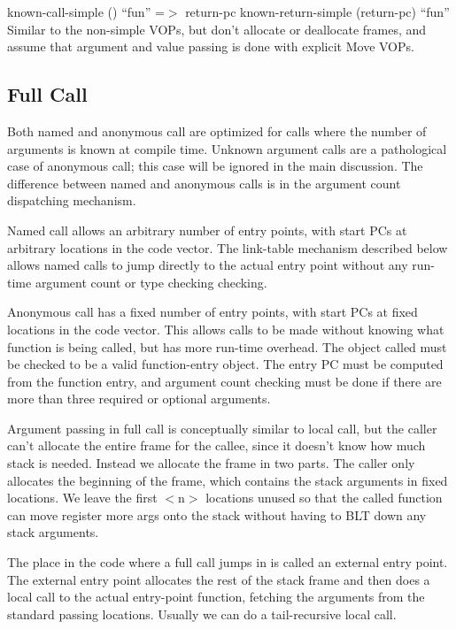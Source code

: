 {\begin{itemize, spread 0, spacing 1}
known-call-simple () ``fun'' =$>$ return-pc
known-return-simple (return-pc) ``fun''
    Similar to the non-simple VOPs, but don't allocate or deallocate frames,
    and assume that argument and value passing is done with explicit Move VOPs.


\subsection{Full Call}

Both named and anonymous call are optimized for calls where the number of
arguments is known at compile time.  Unknown argument calls are a
pathological case of anonymous call; this case will be ignored in the main
discussion.  The difference between named and anonymous calls is in the
argument count dispatching mechanism.

Named call allows an arbitrary number of entry points, with start PCs at
arbitrary locations in the code vector.  The link-table mechanism described
below allows named calls to jump directly to the actual entry point without any
run-time argument count or type checking checking.

Anonymous call has a fixed number of entry points, with start PCs at fixed
locations in the code vector.  This allows calls to be made without knowing
what function is being called, but has more run-time overhead.  The object
called must be checked to be a valid function-entry object.  The entry PC must
be computed from the function entry, and argument count checking must be done
if there are more than three required or optional arguments.

Argument passing in full call is conceptually similar to local call, but the
caller can't allocate the entire frame for the callee, since it doesn't know
how much stack is needed.  Instead we allocate the frame in two parts.  The
caller only allocates the beginning of the frame, which contains the stack
arguments in fixed locations.  We leave the first $<$n$>$ locations unused so that
the called function can move register more args onto the stack without having
to BLT down any stack arguments.

The place in the code where a full call jumps in is called an external entry
point.  The external entry point allocates the rest of the stack frame and then
does a local call to the actual entry-point function, fetching the arguments
from the standard passing locations.  Usually we can do a tail-recursive local
call.  


\end{itemize, spread 0, spacing 1}}
